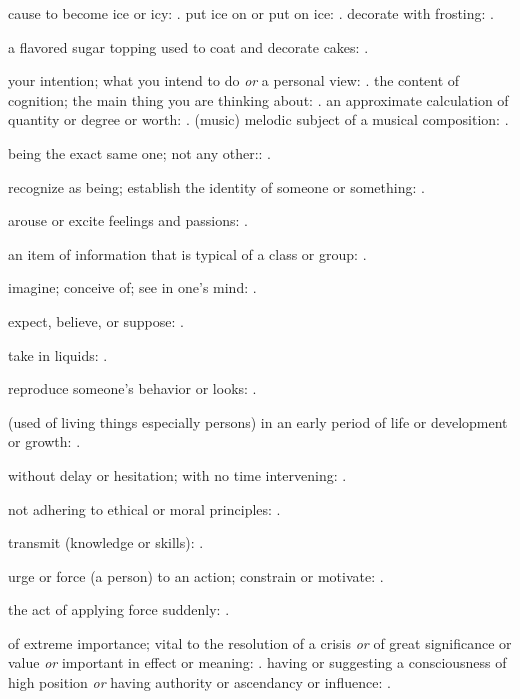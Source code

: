   cause to become ice or icy: . put ice on or put on ice: . decorate with frosting: .

  a flavored sugar topping used to coat and decorate cakes: .

  your intention; what you intend to do \textit{or} a personal view: . the content of cognition; the main thing you are thinking about: . an approximate calculation of quantity or degree or worth: . (music) melodic subject of a musical composition: .

  being the exact same one; not any other:: .

  recognize as being; establish the identity of someone or something: .

  arouse or excite feelings and passions: .

  an item of information that is typical of a class or group: .

  imagine; conceive of; see in one's mind: .

  expect, believe, or suppose: .

  take in liquids: .

  reproduce someone's behavior or looks: .

  (used of living things especially persons) in an early period of life or development or growth: .

  without delay or hesitation; with no time intervening: .

  not adhering to ethical or moral principles: .

  transmit (knowledge or skills): .

  urge or force (a person) to an action; constrain or motivate: .

  the act of applying force suddenly: .

  of extreme importance; vital to the resolution of a crisis \textit{or} of great significance or value \textit{or} important in effect or meaning: . having or suggesting a consciousness of high position \textit{or} having authority or ascendancy or influence: .

